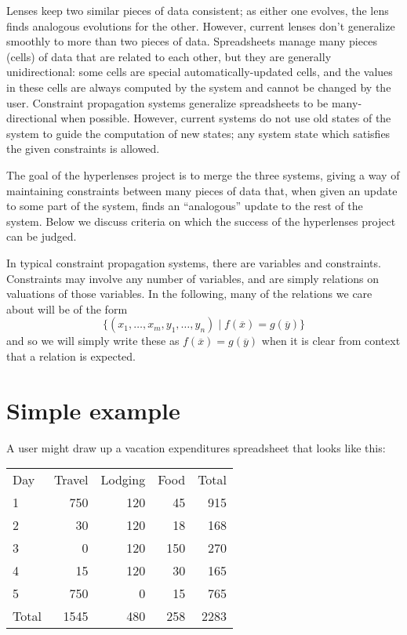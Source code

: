 Lenses keep two similar pieces of data consistent; as either one evolves,
the lens finds analogous evolutions for the other. However, current lenses
don't generalize smoothly to more than two pieces of data. Spreadsheets
manage many pieces (cells) of data that are related to each other, but they
are generally unidirectional: some cells are special automatically-updated
cells, and the values in these cells are always computed by the system and
cannot be changed by the user. Constraint propagation systems generalize
spreadsheets to be many-directional when possible. However, current systems
do not use old states of the system to guide the computation of new states;
any system state which satisfies the given constraints is allowed.


The goal of the hyperlenses project is to merge the three systems, giving a
way of maintaining constraints between many pieces of data that, when given
an update to some part of the system, finds an ``analogous'' update to the
rest of the system. Below we discuss criteria on which the success of the
hyperlenses project can be judged.

In typical constraint propagation systems, there are variables and
constraints. Constraints may involve any number of variables, and are simply
relations on valuations of those variables. In the following, many of the
relations we care about will be of the form
\[\{(x_1,\ldots,x_m,y_1,\ldots,y_n) \mid f(\overline x) = g(\overline y)\}\]
and so we will simply write these as
$f(\overline x) = g(\overline y)$
when it is clear from context that a relation is expected.

\section{Simple example}
A user might draw up a vacation expenditures spreadsheet that looks like
this:

\begin{tabular}[h]{lrrrr}
    Day     & Travel    & Lodging   & Food  & Total \\
    1       & 750       & 120       & 45    & 915   \\
    2       & 30        & 120       & 18    & 168   \\
    3       & 0         & 120       & 150   & 270   \\
    4       & 15        & 120       & 30    & 165   \\
    5       & 750       & 0         & 15    & 765   \\
    Total   & 1545      & 480       & 258   & 2283  \\
\end{tabular}

